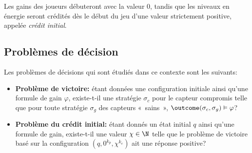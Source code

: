 Les gains des joueurs débuteront avec la valeur $0$, tandis que les niveaux en énergie seront crédités dès le début du jeu d'une valeur strictement positive, appelée \emph{crédit initial}.

\subsection{Problèmes de décision}

Les problèmes de décisions qui sont étudiés dans ce contexte sont les suivants:

\begin{itemize}
    \item \textbf{Problème de victoire:} étant données une configuration initiale ainsi qu'une formule de gain $\varphi$, existe-t-il une stratégie $\sigma_c$ pour le capteur compromis telle que pour toute stratégie $\sigma_g$ des capteurs « sains », $\outcome(\sigma_c,\sigma_g) \vDash \varphi$?
    \item \textbf{Problème du crédit initial:} étant donnés un état initial $q$ ainsi qu'une formule de gain, existe-t-il une valeur $\chi \in \N$ telle que le problème de victoire basé sur la configuration $(q,0^{k_p},\chi^{k_e})$ ait une réponse positive?
\end{itemize}
